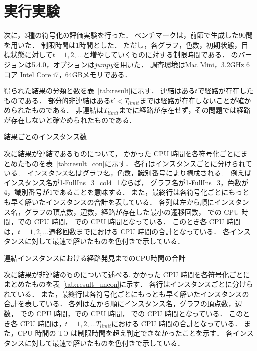 \section{実行実験}
次に，3種の符号化の評価実験を行った．
ベンチマークは，前節で生成した90問を用いた．
制限時間は1時間とした．
ただし，各グラフ，色数，初期状態，目標状態に対して$t=1, 2, \dots$と増やしていくものに対する制限時間である．
{\clingo}のバージョンは5.4.0，オプションは\textsl{jumpy}を用いた．
調査環境はMac Mini，3.2GHz 6コア Intel Core i7，64GBメモリである．

得られた結果の分類と数を表~\ref{tab:result}に示す．
連結はある$t$で経路が存在したものである．
部分的非連結はある$t' < T_{limit}$までは経路が存在しないことが確かめられたものである．
非連結は$T_{limit}$までに経路が存在せず，その問題では経路が存在しないと確かめられたものである．

\begin{table}
  \centering
  \caption{結果ごとのインスタンス数}
  
  \label{tab:result}
\end{table}

次に結果が連結であるものについて，
かかった CPU 時間を各符号化ごとにまとめたものを表~\ref{tab:result_con}に示す．
各行はインスタンスごとに分けられている．
インスタンス名はグラフ名，色数，識別番号により構成される．
例えばインスタンス名が1-FullIns\_3\_col4\_1ならば，
グラフ名が1-FullIns\_3，色数が4，識別番号が1であることを意味する．
また，最終行は各符号化ごとにもっとも早く解いたインスタンスの合計を表している．
各列は左から順にインスタンス名，グラフの頂点数，辺数，経路が存在した最小の遷移回数，
での CPU 時間，での CPU 時間，
での CPU 時間となっている．
このとき各 CPU 時間は，$t=1, 2, \dots $遷移回数までにおける CPU 時間の合計となっている．
各インスタンスに対して最速で解いたものを色付きで示している．

\begin{table}
  \centering
  \caption{連結インスタンスにおける経路発見までのCPU時間の合計}
  
  \label{tab:result_con}
\end{table}

次に結果が非連結のものについて述べる.
かかった CPU 時間を各符号化ごとにまとめたものを表~\ref{tab:result_uncon}に示す．
各行はインスタンスごとに分けられている．
また，最終行は各符号化ごとにもっとも早く解いたインスタンスの合計を表している．
各列は左から順にインスタンス名，グラフの頂点数，辺数，
での CPU 時間，での CPU 時間，
での CPU 時間となっている．
このとき各 CPU 時間は，$t=1, 2, \dots T_{limit}$における CPU 時間の合計となっている．
また，CPU 時間の TO は制限時間を超え判定できなかったことを示す．
各インスタンスに対して最速で解いたものを色付きで示している．


